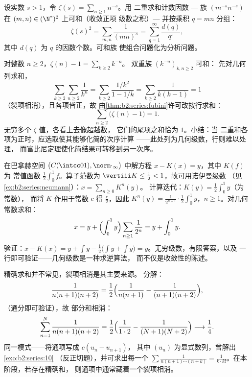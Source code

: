 \begin{example}[一个二重求和的计算]\label{ex:b2:series:doublesum}
设实数 $s > 1$，令 $\zeta(s) = \sum_{n\geq1} n^{-s}$。用
二重求和计数因数 --- 族 $(m^{-s}n^{-s})$ 在
$(m,n) \in (\N^*)^2$ 上可和（收敛正项
级数之积）--- 并按乘积 $q = mn$ 分组：
\[
\zeta(s)^2 = \sum_{m,n} \frac{1}{(mn)^s}
= \sum_{q=1}^{\infty} \frac{d(q)}{q^s},
\]
其中 $d(q)$ 为 $q$ 的因数个数。可和族
使组合问题化为分析问题。
\end{example}

\begin{example}[用富比尼定理求值：$\sum_n (\zeta(n) - 1) = 1$]\label{ex:b2:series:zetasum}
对整数 $n \geq 2$，$\zeta(n) - 1 = \sum_{k \geq 2} k^{-n}$。
双重族 $(k^{-n})_{k, n \geq 2}$ 可和：
先对几何列求和，
\[
\sum_{k\geq2}\sum_{n\geq2} \frac{1}{k^n}
= \sum_{k\geq2} \frac{1/k^2}{1 - 1/k}
= \sum_{k\geq2} \frac{1}{k(k-1)} = 1
\]
（裂项相消），且各项皆正，故
由\cref{thm:b2:series:fubini}许可改按行求和：
\[
\sum_{n\geq2}\bigl(\zeta(n) - 1\bigr) = 1 .
\]
无穷多个 $\zeta$ 值，各看上去像超越数，
它们的尾项之和恰为 $1$。小结：当
二重和各项为正时，应选取使其能够化简的次序计算
——此处列为几何级数，行则难以处理，
而富比尼定理使化简结果可转移到另一次序。
\end{example}

\begin{example}[几何级数解方程]\label{ex:b2:series:neumannsolve}
在巴拿赫空间 $\bigl(C(\intcc01),
\norm\cdot_\infty\bigr)$ 中解方程 $x - K(x) = y$，其中 $K(f)$ 为
常值函数 $\frac12\int_0^1 f$。算子范数为
$\vertiii K \leq \frac12 < 1$，故可用诺伊曼级数
（见\cref{ex:b2:series:neumann}）：$x = \sum_{n\geq0} K^n(y)$。
计算迭代：$K(y) = \frac12\int_0^1 y$（为常数），
而将 $K$ 作用于常数 $c$ 得 $\frac c2$，因此
$K^n(y) = \frac{1}{2^{n-1}}\cdot\frac12\int_0^1 y$，$n \geq
1$。对几何常数求和：
\[
x = y + \Bigl(\int_0^1 y\Bigr)
\sum_{n\geq1}\frac{1}{2^n} = y + \int_0^1 y .
\]
验证：$x - K(x) = y + \int y - \frac12\bigl(\int y + \int
y\bigr) = y$。无穷级数，有限答案，以及
一行即可验证——几何级数是一种求逆算法，
而不仅是收敛性的陈述。
\end{example}

\begin{example}[利用部分分式裂项相消]\label{ex:b2:series:telescope}
精确求和并不常见，裂项相消是其主要来源。
分解：
\[
\frac{1}{n(n+1)(n+2)}
= \frac{1}{2}\Bigl(\frac{1}{n(n+1)} -
\frac{1}{(n+1)(n+2)}\Bigr),
\]
（通分即可验证），故
部分和相消：
\[
\sum_{n=1}^{N}\frac{1}{n(n+1)(n+2)}
= \frac12\Bigl(\frac{1}{1\cdot2} -
\frac{1}{(N+1)(N+2)}\Bigr)
\longrightarrow \frac14 .
\]
同一模式——将通项写成 $c(u_n - u_{n+1})$，
其中 $(u_n)$ 为显式数列，曾解出\cref{exo:b2:series:10}
（反正切题），并可求出每一个 $\sum\frac{1}{n(n+1)\cdots(n +
k)} = \frac{1}{k\cdot k!}$。在本阶段，若存在精确和，
则通项中通常藏着一个裂项相消。
\end{example}

